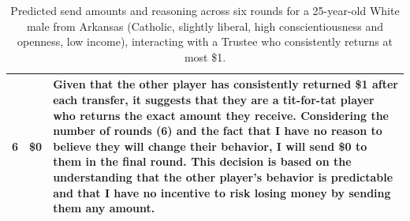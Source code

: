 \documentclass{article} %
\begin{document}
\begin{appendices}
\begin{table}[h]
\begin{tabular}{c|c|p{10.2cm}}
\midrule
6 & \$0 & Given that the other player has consistently returned \$1 after each transfer, it suggests that they are a tit-for-tat player who returns the exact amount they receive. Considering the number of rounds (6) and the fact that I have no reason to believe they will change their behavior, I will send \$0 to them in the final round. This decision is based on the understanding that the other player's behavior is predictable and that I have no incentive to risk losing money by sending them any amount. \\
\bottomrule
\end{tabular}
\caption{Predicted send amounts and reasoning across six rounds for a 25-year-old White male from Arkansas (Catholic, slightly liberal, high conscientiousness and openness, low income), interacting with a Trustee who consistently returns at most \$1.}
\label{tab:individual-belief-sample-1}
\end{table}



\end{appendices}
\end{document}
